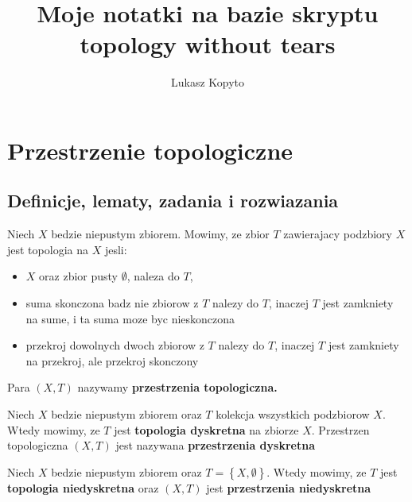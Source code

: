 \documentclass{article}
\author{Lukasz Kopyto}
\title{Moje notatki na bazie skryptu topology without tears}
\begin{document}
\maketitle     %

\section{Przestrzenie topologiczne}
\subsection{Definicje, lematy, zadania i rozwiazania}
\begin{tcolorbox}[colback=white!90!red,colframe=black!35!red,title=1.1.1 Definicja: Topologia]

Niech $X$ bedzie niepustym zbiorem. Mowimy, ze zbior $T$ zawierajacy podzbiory $X$ jest topologia na $X$ jesli:
\begin{itemize}
\item $X$ oraz zbior pusty $\emptyset$, naleza do $T$,
\item suma skonczona badz nie zbiorow z $T$ nalezy do $T$,
inaczej $T$ jest zamkniety na sume, i ta suma moze byc nieskonczona
\item przekroj dowolnych dwoch zbiorow z $T$ nalezy do $T$, inaczej $T$ jest zamkniety na przekroj, ale przekroj skonczony
\end{itemize}

Para $(X,T)$ nazywamy \textbf{przestrzenia topologiczna.}
\end{tcolorbox}

\begin{tcolorbox}[colback=white!90!red,colframe=black!35!red,title=1.1.6 Definicja: Topologia dyskretna(discrete topology)]

Niech $X$ bedzie niepustym zbiorem oraz $T$ kolekcja wszystkich podzbiorow $X$. Wtedy mowimy, ze $T$ jest \textbf{topologia dyskretna} na zbiorze $X$. Przestrzen topologiczna $(X,T)$ jest nazywana \textbf{przestrzenia dyskretna}
\end{tcolorbox}

\begin{tcolorbox}[colback=white!90!red,colframe=black!35!red,title=1.1.7 Definicja: Topologia niedyskretne(indiscrete topology)]

Niech $X$ bedzie niepustym zbiorem oraz $T= \left\{X, \emptyset\right\}$. Wtedy mowimy, ze $T$ jest \textbf{topologia niedyskretna} oraz $(X,T)$ jest \textbf{przestrzenia niedyskretna} 

\end{tcolorbox}
\end{document}
